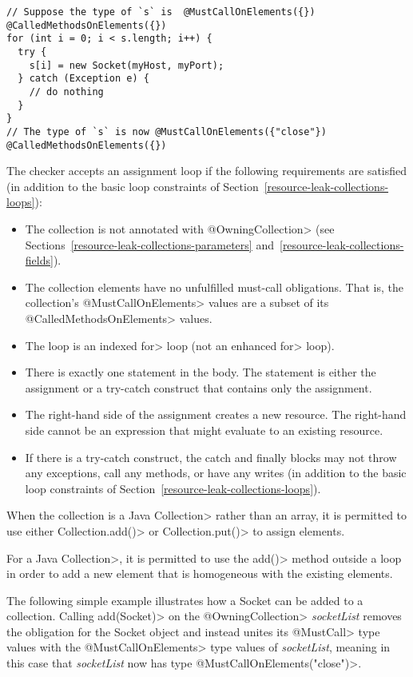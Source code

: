 \begin{Verbatim}
// Suppose the type of `s` is  @MustCallOnElements({}) @CalledMethodsOnElements({})
for (int i = 0; i < s.length; i++) {
  try {
    s[i] = new Socket(myHost, myPort);
  } catch (Exception e) {
    // do nothing
  }
}
// The type of `s` is now @MustCallOnElements({"close"}) @CalledMethodsOnElements({})
\end{Verbatim}

The checker accepts an assignment loop if the following requirements are
satisfied (in addition to the basic loop constraints of Section~\ref{resource-leak-collections-loops}):

\begin{itemize}
  \item The collection is not annotated with \<@OwningCollection> (see
    Sections~\ref{resource-leak-collections-parameters} and~\ref{resource-leak-collections-fields}).
  \item The collection elements have no unfulfilled must-call obligations.  That
    is, the collection's \<@MustCallOnElements> values are a subset of its
  \<@CalledMethodsOnElements> values.
  \item The loop is an indexed \<for> loop (not an enhanced \<for> loop).
  \item There is exactly one statement in the body.  The statement is either the
    assignment or a try-catch construct that contains only the assignment.
  \item The right-hand side of the assignment creates a new resource.
    The right-hand side cannot be an expression that might evaluate to an existing resource.
  \item If there is a try-catch construct, the catch and finally blocks may
    not throw any exceptions, call any methods, or have any writes (in
    addition to the basic loop constraints of Section~\ref{resource-leak-collections-loops}).
\end{itemize}

When the collection is a Java \<Collection> rather than an array, it is
permitted to use either \<Collection.add()> or \<Collection.put()> to assign
elements.

For a Java \<Collection>, it is permitted to use the \<add()> method outside a
loop in order to add a new element that is homogeneous with the existing elements.

The following simple example illustrates how a Socket can be added to a collection. Calling \<add(Socket)> on the \<@OwningCollection> \textit{socketList} removes the obligation for the Socket object and instead unites its \<@MustCall> type values with the \<@MustCallOnElements> type values of \textit{socketList}, meaning in this case that \textit{socketList} now has type  \<@MustCallOnElements({"close"})>.

